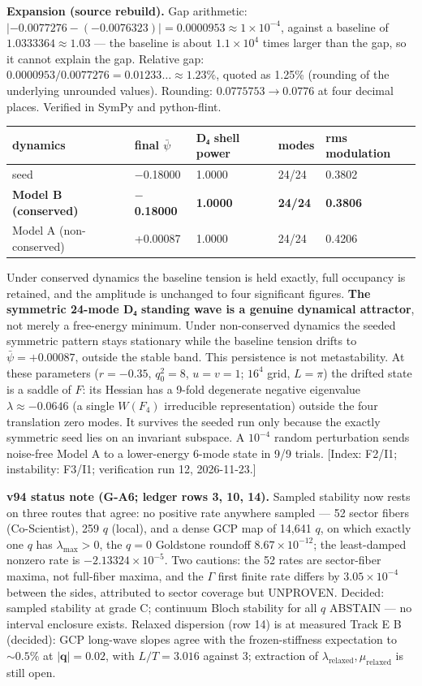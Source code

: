 \documentclass[a4paper,11pt]{article}
\newcommand{\expansion}[1]{\par\smallskip\noindent\textbf{Expansion (source rebuild).} #1\par\smallskip}
\begin{document}
\expansion{Gap arithmetic: $|-0.0077276 - (-0.0076323)| = 0.0000953 \approx 1\times10^{-4}$, against a baseline of $1.0333364 \approx 1.03$ --- the baseline is about $1.1\times10^4$ times larger than the gap, so it cannot explain the gap. Relative gap: $0.0000953/0.0077276 = 0.01233\ldots \approx 1.23\%$, quoted as 1.25\% (rounding of the underlying unrounded values). Rounding: $0.0775753 \to 0.0776$ at four decimal places. Verified in SymPy and python-flint.}
\begin{center}
\begin{tabular}{lllll}
\hline
dynamics & final $\bar\psi$ & D₄ shell power & modes & rms modulation \\
\hline
seed & $-$0.18000 & 1.0000 & 24/24 & 0.3802 \\
\textbf{Model B (conserved)} & \textbf{$-$0.18000} & \textbf{1.0000} & \textbf{24/24} & \textbf{0.3806} \\
Model A (non-conserved) & +0.00087 & 1.0000 & 24/24 & 0.4206 \\
\hline
\end{tabular}
\end{center}

Under conserved dynamics the baseline tension is held exactly, full occupancy is retained, and the amplitude is unchanged to four significant figures. \textbf{The symmetric 24-mode D₄ standing wave is a genuine dynamical attractor}, not merely a free-energy minimum. Under non-conserved dynamics the seeded symmetric pattern stays stationary while the baseline tension drifts to $\bar\psi=+0.00087$, outside the stable band. This persistence is not metastability. At these parameters ($r=-0.35$, $q_0^2=8$, $u=v=1$; $16^4$ grid, $L=\pi$) the drifted state is a saddle of $F$: its Hessian has a 9-fold degenerate negative eigenvalue $\lambda\approx-0.0646$ (a single $W(F_4)$ irreducible representation) outside the four translation zero modes. It survives the seeded run only because the exactly symmetric seed lies on an invariant subspace. A $10^{-4}$ random perturbation sends noise-free Model A to a lower-energy 6-mode state in 9/9 trials. [Index: F2/I1; instability: F3/I1; verification run 12, 2026-11-23.]

\textbf{v94 status note (G-A6; ledger rows 3, 10, 14).} Sampled stability now rests on three routes that agree: no positive rate anywhere sampled --- 52 sector fibers (Co-Scientist), 259 $q$ (local), and a dense GCP map of 14,641 $q$, on which exactly one $q$ has $\lambda_{\max}>0$, the $q=0$ Goldstone roundoff $8.67\times10^{-12}$; the least-damped nonzero rate is $-2.13324\times10^{-5}$. Two cautions: the 52 rates are sector-fiber maxima, not full-fiber maxima, and the $\Gamma$ first finite rate differs by $3.05\times10^{-4}$ between the sides, attributed to sector coverage but UNPROVEN. Decided: sampled stability at grade C; continuum Bloch stability for all $q$ ABSTAIN --- no interval enclosure exists. Relaxed dispersion (row 14) is at measured Track E B (decided): GCP long-wave slopes agree with the frozen-stiffness expectation to $\sim0.5\%$ at $|\mathbf{q}|=0.02$, with $L/T=3.016$ against $3$; extraction of $\lambda_{\mathrm{relaxed}},\mu_{\mathrm{relaxed}}$ is still open.
\end{document}
